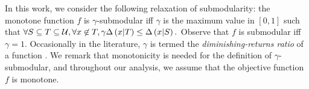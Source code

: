 In this work, we consider the following relaxation of
submodularity: the monotone function $f$ is $\gamma$-submodular
iff $\gamma$ is the maximum
value in $[0,1]$ such that $\forall S \subseteq T \subseteq \mathcal{U}, \forall x \not \in T, \gamma \Delta \left( x | T \right) \le \Delta \left( x | S \right).$
Observe that $f$ is submodular iff $\gamma = 1$. 
Occasionally in the literature, $\gamma$ is termed the \textit{diminishing-returns ratio} of a function
\cite{Bian2017b,Kuhnle2018}.
We remark that monotonicity is needed for the definition of $\gamma$-submodular,
and throughout our analysis, we assume that the objective function $f$ is monotone. 

